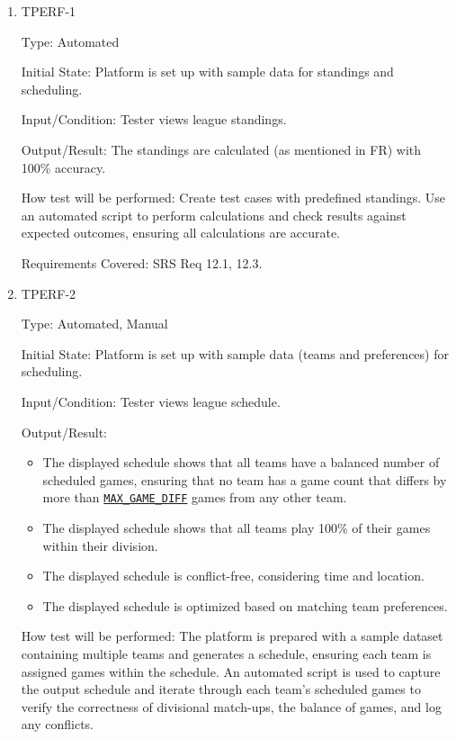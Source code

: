 \documentclass[12pt, titlepage]{article}
\begin{document}
\begin{enumerate}

\item{TPERF-1\\}

Type: Automated

Initial State: Platform is set up with sample data for standings and scheduling.

Input/Condition: Tester views league standings.

Output/Result: The standings are calculated (as mentioned in FR) with 100\% accuracy.

How test will be performed: Create test cases with predefined standings. Use an automated script to perform calculations and check results against expected outcomes, ensuring all calculations are accurate.

Requirements Covered: SRS Req 12.1, 12.3.

\item{TPERF-2\\}

Type: Automated, Manual

Initial State: Platform is set up with sample data (teams and preferences) for scheduling.

Input/Condition: Tester views league schedule.

Output/Result:
\begin{itemize}
\item{The displayed schedule shows that all teams have a balanced number of scheduled games, ensuring that no team has a game count that differs by more than \hyperref[MAX_GAME_DIFF]{\texttt{MAX\_GAME\_DIFF}} games from any other team.}
\item{The displayed schedule shows that all teams play 100\% of their games within their division.}
\item{The displayed schedule is conflict-free, considering time and location.}
\item{The displayed schedule is optimized based on matching team preferences.}
\end{itemize}

How test will be performed:  The platform is prepared with a sample dataset containing multiple teams and generates a schedule, ensuring each team is assigned games within the schedule. An automated script is used to capture the output schedule and iterate through each team's scheduled games to verify the correctness of divisional match-ups, the balance of games, and log any conflicts.


\end{enumerate}
\end{document}
